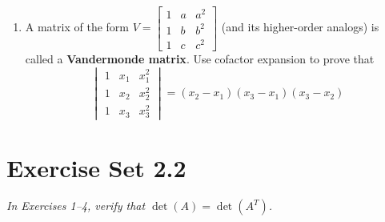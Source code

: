 \documentclass{article}
\theoremstyle{mystyle}
\begin{document}
\begin{enumerate}
\item[43.] A matrix of the form $V=\begin{bmatrix}1&a&a^2\\1&b&b^2\\1&c&c^2\end{bmatrix}$ (and its higher-order analogs) is called a \textbf{Vandermonde matrix}. Use cofactor expansion to prove that
\[
\begin{vmatrix}1&x_1&x_1^2\\1&x_2&x_2^2\\1&x_3&x_3^2\end{vmatrix}=(x_2-x_1)(x_3-x_1)(x_3-x_2)
\]

\end{enumerate}

\section*{Exercise Set 2.2}

\noindent\textit{In Exercises 1--4, verify that $\det(A)=\det(A^T)$.}
\end{document}
